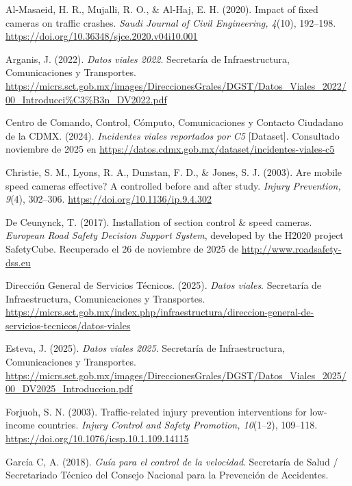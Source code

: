 \begin{thebibliography}{}

Al-Masaeid, H. R., Mujalli, R. O., \& Al-Haj, E. H. (2020). Impact of fixed cameras on traffic crashes. \textit{Saudi Journal of Civil Engineering, 4}(10), 192–198. \url{https://doi.org/10.36348/sjce.2020.v04i10.001}

Arganis, J. (2022). \textit{Datos viales 2022}. Secretaría de Infraestructura, Comunicaciones y Transportes. \url{https://micrs.sct.gob.mx/images/DireccionesGrales/DGST/Datos_Viales_2022/00_Introducci%C3%B3n_DV2022.pdf}

Centro de Comando, Control, Cómputo, Comunicaciones y Contacto Ciudadano de la CDMX. (2024). \textit{Incidentes viales reportados por C5} [Dataset]. Consultado noviembre de 2025 en \url{https://datos.cdmx.gob.mx/dataset/incidentes-viales-c5}

Christie, S. M., Lyons, R. A., Dunstan, F. D., \& Jones, S. J. (2003). Are mobile speed cameras effective? A controlled before and after study. \textit{Injury Prevention, 9}(4), 302–306. \url{https://doi.org/10.1136/ip.9.4.302}

De Ceunynck, T. (2017). Installation of section control \& speed cameras. \textit{European Road Safety Decision Support System}, developed by the H2020 project SafetyCube. Recuperado el 26 de noviembre de 2025 de \url{http://www.roadsafety-dss.eu}

Dirección General de Servicios Técnicos. (2025). \textit{Datos viales}. Secretaría de Infraestructura, Comunicaciones y Transportes. \url{https://micrs.sct.gob.mx/index.php/infraestructura/direccion-general-de-servicios-tecnicos/datos-viales}

Esteva, J. (2025). \textit{Datos viales 2025}. Secretaría de Infraestructura, Comunicaciones y Transportes. \url{https://micrs.sct.gob.mx/images/DireccionesGrales/DGST/Datos_Viales_2025/00_DV2025_Introduccion.pdf}

Forjuoh, S. N. (2003). Traffic-related injury prevention interventions for low-income countries. \textit{Injury Control and Safety Promotion, 10}(1–2), 109–118. \url{https://doi.org/10.1076/icsp.10.1.109.14115}

García C, A. (2018). \textit{Guía para el control de la velocidad}. Secretaría de Salud / Secretariado Técnico del Consejo Nacional para la Prevención de Accidentes.


\end{thebibliography}
